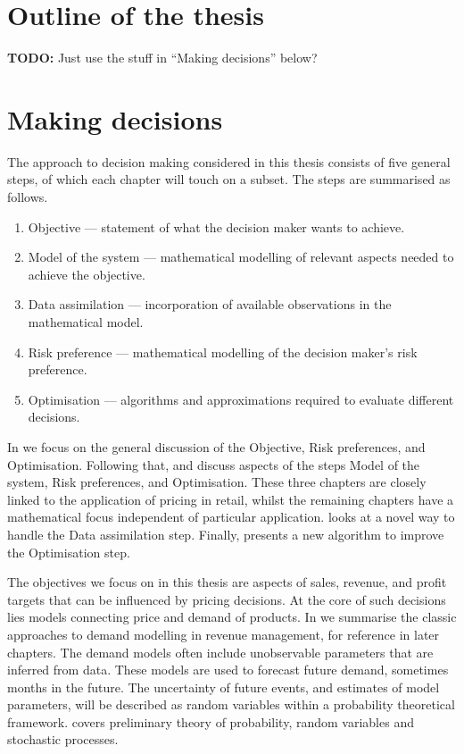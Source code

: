 \documentclass[main.tex]{subfiles}
\begin{document}
\section{Outline of the thesis}
\textbf{TODO:} Just use the stuff in ``Making decisions'' below?

\section{Making decisions}
The approach to decision making considered in this thesis consists of
five general steps, of which each chapter will touch on a subset.
The steps are summarised as follows.
\begin{enumerate}
\item Objective --- statement of what the decision maker wants to achieve.
\item Model of the system --- mathematical modelling of relevant aspects
  needed to achieve the objective.
\item Data assimilation --- incorporation of available observations in
  the mathematical model.
\item Risk preference --- mathematical modelling of the decision maker's risk
  preference.
\item Optimisation --- algorithms and approximations required to
  evaluate different decisions.
\end{enumerate}
In  we focus on the general discussion of the
Objective, Risk preferences, and Optimisation.
Following that,  and
 discuss  aspects of the steps Model of the system, Risk
preferences, and Optimisation.
These three chapters are closely linked to the application of pricing
in retail, whilst the remaining chapters have a mathematical focus
independent of particular application.
 looks at a novel way to handle the Data
assimilation step. Finally,  presents a new
algorithm to improve the Optimisation step.

The objectives we focus on in this thesis are aspects
of sales, revenue, and profit targets that can be influenced by
pricing decisions.
At the core of such decisions lies models connecting price and demand of products.
In  we summarise the classic approaches
to demand modelling in revenue management, for reference in later
chapters.
The demand models often include unobservable parameters that are
inferred from data.
These models are used to forecast future demand, sometimes months in
the future.
The uncertainty of future events, and estimates of model
parameters, will be described as random variables within a probability
theoretical framework.  covers preliminary
theory of probability, random variables and stochastic
processes.
\end{document}
